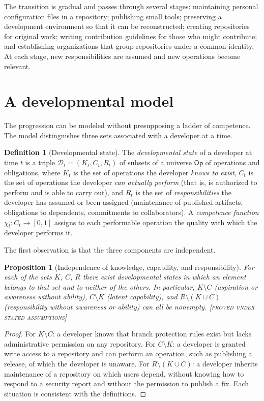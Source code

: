 \documentclass[11pt,twoside,openright]{book}
\theoremstyle{plain}
\newtheorem{proposition}[theorem]{Proposition}
\theoremstyle{definition}
\newtheorem{definition}[theorem]{Definition}
\theoremstyle{remark}
\newcommand{\Proved}{\textup{\textsc{[proved under stated assumptions]}}}
\begin{document}
The transition is gradual and passes through several stages: maintaining personal configuration files in a repository; publishing small tools; preserving a development environment so that it can be reconstructed; creating repositories for original work; writing contribution guidelines for those who might contribute; and establishing organizations that group repositories under a common identity. At each stage, new responsibilities are assumed and new operations become relevant.

\section{A developmental model}

The progression can be modeled without presupposing a ladder of competence. The model distinguishes three sets associated with a developer at a time.

\begin{definition}[Developmental state]\label{def:devstate}
The \emph{developmental state} of a developer at time $t$ is a triple $\mathcal{D}_t=(K_t,C_t,R_t)$ of subsets of a universe $\mathsf{Op}$ of operations and obligations, where $K_t$ is the set of operations the developer \emph{knows to exist}, $C_t$ is the set of operations the developer \emph{can actually perform} (that is, is authorized to perform and is able to carry out), and $R_t$ is the set of \emph{responsibilities} the developer has assumed or been assigned (maintenance of published artifacts, obligations to dependents, commitments to collaborators). A \emph{competence function} $\chi_t:C_t\to[0,1]$ assigns to each performable operation the quality with which the developer performs it.
\end{definition}

The first observation is that the three components are independent.

\begin{proposition}[Independence of knowledge, capability, and responsibility]\label{prop:devindep}
For each of the sets $K$, $C$, $R$ there exist developmental states in which an element belongs to that set and to neither of the others. In particular, $K\setminus C$ (aspiration or awareness without ability), $C\setminus K$ (latent capability), and $R\setminus(K\cup C)$ (responsibility without awareness or ability) can all be nonempty.
\Proved{}
\end{proposition}

\begin{proof}
For $K\setminus C$: a developer knows that branch protection rules exist but lacks administrative permission on any repository. For $C\setminus K$: a developer is granted write access to a repository and can perform an operation, such as publishing a release, of which the developer is unaware. For $R\setminus(K\cup C)$: a developer inherits maintenance of a repository on which users depend, without knowing how to respond to a security report and without the permission to publish a fix. Each situation is consistent with the definitions.
\end{proof}
\end{document}
